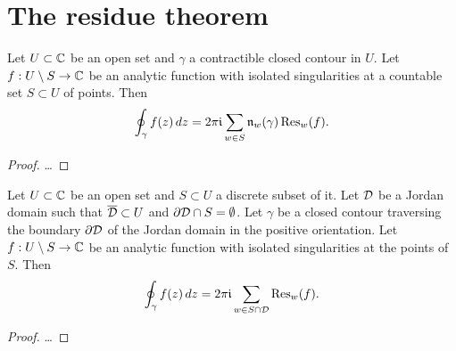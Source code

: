 \section{The residue theorem}

\begin{theorem}
  \label{thm:RESIDUE_THEOREM}
  Let $U \subset \mathbb{C}$ be an open set and $\gamma$ a contractible closed contour in $U$.
  Let $f : U \setminus S \to \mathbb{C}$ be an analytic function with isolated
  singularities at a countable set $S \subset U$ of points.
  Then
  \begin{align*}
    \oint_\gamma f(z) \, dz
      = 2 \pi \mathfrak{i} \sum_{w \in S} \mathfrak{n}_{{w}}(\gamma) \, \mathrm{Res}_{{w}}({f}) .
  \end{align*}
\end{theorem}
\begin{proof}
  \ldots
\end{proof}

\begin{corollary}
  \label{thm:jordan_residue_theorem}
  Let $U \subset \mathbb{C}$ be an open set and $S \subset U$ a discrete subset of it.
  Let $\mathcal{D}$ be a Jordan domain such that $\overline{{\mathcal{D}}} \subset U$
  and $\partial \mathcal{D} \cap S = \emptyset$.
  Let $\gamma$ be a closed contour traversing the boundary $\partial \mathcal{D}$
  of the Jordan domain in the positive orientation.
  Let $f : U \setminus S \to \mathbb{C}$ be an analytic function with isolated
  singularities at the points of $S$.
  Then
  \begin{align*}
    \oint_\gamma f(z) \, dz = 2 \pi \mathfrak{i} \sum_{w \in S \cap \mathcal{D}} \mathrm{Res}_{{w}}({f}) .
  \end{align*}
\end{corollary}
\begin{proof}
  \ldots
\end{proof}
